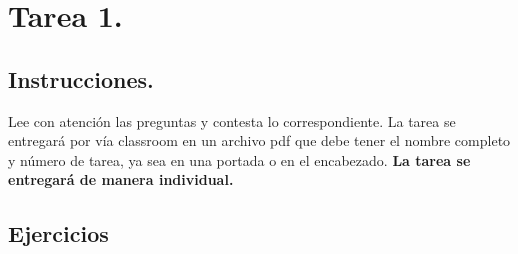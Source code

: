 \documentclass[12pt]{article}
\begin{document}

{\color{blue} \section*{Tarea 1.}}

{\color{blue} \subsection*{Instrucciones.}}
\vspace{0.5em} 

Lee con atención las preguntas y contesta lo correspondiente. La tarea se entregará por vía classroom
en un archivo pdf que debe tener el nombre completo y número de tarea, ya sea en una portada o en el encabezado.
\textbf{La tarea se entregará de manera individual.}\\

{\color{blue} \subsection*{Ejercicios}}
\vspace{0.5em}
\end{document}
